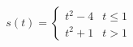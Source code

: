 \documentclass[preview]{standalone}
\begin{document}
\begin{align*}
s(t)=\begin{cases}t^2-4 & t \leq 1\\t^2 +1 & t>1\end{cases}
\end{align*}
\end{document}
